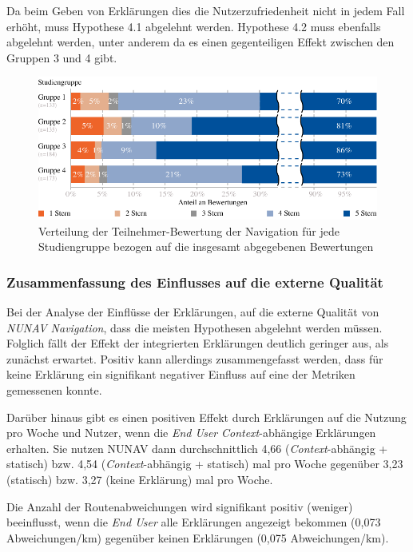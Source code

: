 Da beim Geben von Erklärungen dies die Nutzerzufriedenheit nicht in jedem Fall erhöht, muss Hypothese 4.1 abgelehnt werden. Hypothese 4.2 muss ebenfalls abgelehnt werden, unter anderem da es einen gegenteiligen Effekt zwischen den Gruppen 3 und 4 gibt.

\begin{figure}[t!]
    \centering
    \includegraphics[width=\textwidth]{contents/06_model_evaluation/02_evaluation/res/rating_result_overview.pdf}
    \caption{Verteilung der Teilnehmer-Bewertung der Navigation für jede Studiengruppe bezogen auf die insgesamt abgegebenen Bewertungen}
    \label{fig:Rating_Result_Overview}
\end{figure}

\subsubsection{Zusammenfassung des Einflusses auf die externe Qualität}

Bei der Analyse der Einflüsse der Erklärungen, auf die externe Qualität von \textit{NUNAV Navigation}, dass die meisten Hypothesen abgelehnt werden müssen. Folglich fällt der Effekt der integrierten Erklärungen deutlich geringer aus, als zunächst erwartet. Positiv kann allerdings zusammengefasst werden, dass für keine Erklärung ein signifikant negativer Einfluss auf eine der Metriken gemessenen konnte.

Darüber hinaus gibt es einen positiven Effekt durch Erklärungen auf die Nutzung pro Woche und Nutzer, wenn die \textit{End User} \textit{Context}-abhängige Erklärungen erhalten. Sie nutzen NUNAV dann durchschnittlich 4,66 (\textit{Context}-abhängig + statisch) bzw. 4,54 (\textit{Context}-abhängig + statisch) mal pro Woche gegenüber 3,23 (statisch) bzw. 3,27 (keine Erklärung) mal pro Woche.

Die Anzahl der Routenabweichungen wird signifikant positiv (weniger) beeinflusst, wenn die \textit{End User} alle Erklärungen angezeigt bekommen (0,073 Abweichungen/km) gegenüber keinen Erklärungen (0,075 Abweichungen/km). 

